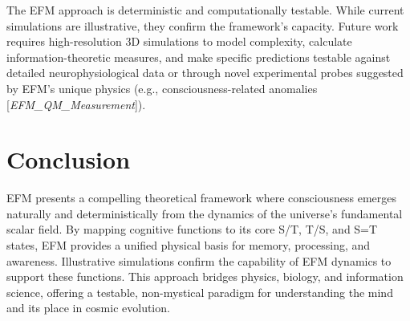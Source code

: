 \documentclass[11pt]{article}
\newcommand{\citep}[1]{[\textit{#1}]} %
\begin{document}
The EFM approach is deterministic and computationally testable. While current simulations are illustrative, they confirm the framework's capacity. Future work requires high-resolution 3D simulations to model complexity, calculate information-theoretic measures, and make specific predictions testable against detailed neurophysiological data or through novel experimental probes suggested by EFM's unique physics (e.g., consciousness-related anomalies \citep{EFM_QM_Measurement}).

\section{Conclusion}
EFM presents a compelling theoretical framework where consciousness emerges naturally and deterministically from the dynamics of the universe's fundamental scalar field. By mapping cognitive functions to its core S/T, T/S, and S=T states, EFM provides a unified physical basis for memory, processing, and awareness. Illustrative simulations confirm the capability of EFM dynamics to support these functions. This approach bridges physics, biology, and information science, offering a testable, non-mystical paradigm for understanding the mind and its place in cosmic evolution.

\appendix
\end{document}
